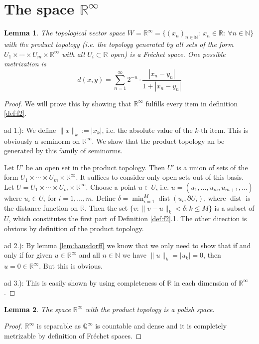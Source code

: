 \documentclass{scrartcl}
\newtheorem{lemma}{Lemma}
\theoremstyle{definition}
\theoremstyle{remark}
\newcommand{\Frechet}{Fr\'echet }
\newcommand{\N}{\mathbb N}
\newcommand{\R}{\mathbb R}
\newcommand{\Q}{\mathbb Q}
\newcommand{\del}{\partial}
\newcommand{\dist}{\operatorname{dist}}
\begin{document}
\section{The space $\R^\infty$}
\begin{lemma}
The topological vector space $W = \R^\infty = \{(x_n)_{n\in\N}: ~x_n\in\R:~\forall n\in\N \}$ with the product topology (i.e. the topology generated by all sets of the form $U_1\times\cdots\times U_m\times \R^\infty$ with all $U_i\subset \R $ open) is a \Frechet space. One possible metrization is
\begin{equation}
d(x, y) = \sum_{n=1}^{\infty}2^{-n}\cdot \frac{|x_n-y_n|}{1 + |x_n-y_n|}
\end{equation}
\end{lemma}
\begin{proof}
We will prove this by showing that $\R^\infty$ fulfills every item in definition \ref{def:f2}.

ad 1.): We define $\|x\|_k := |x_k|$, i.e. the absolute value of the $k$-th item. This is obviously a seminorm on $\R^\infty$. We show that the product topology an be generated by this family of seminorms. 

Let $U'$ be an open set in the product topology. Then $U'$ is a union of sets of the form $U_1\times\cdots\times U_m\times \R^\infty$. It suffices to consider only open sets out of this basis. Let $U = U_1\times\cdots\times U_m\times \R^\infty$. Choose a point $u\in U$, i.e. $u = (u_1, \ldots, u_m, u_{m+1},\ldots)$ where $u_i \in U_i$ for $i=1,\ldots, m$. Define $\delta = \min_{i=1}^M \dist(u_i, \del U_i)$, where $\dist$ is the distance function on $\R$. Then the set $\{v: \|v-u\|_k < \delta: k\leq M\} $ is a subset of $U$, which constitutes the first part of Definition \ref{def:f2}.1. The other direction is obvious by definition of the product topology.

ad 2.): By lemma \ref{lem:hausdorff} we know that we only need to show that if and only if for given $u\in\R^\infty$ and all $n\in \N$ we have $\|u\|_k = |u_k| = 0$, then $u=0\in\R^\infty$. But this is obvious.

ad 3.): This is easily shown by using completeness of $\R$ in each dimension of $\R^\infty$.
\end{proof}

\begin{lemma}
The space $\R^\infty$ with the product topology is a polish space.
\end{lemma}
\begin{proof}
$\R^\infty$ is separable as $\Q^\infty$ is countable and dense and it is completely metrizable by definition of \Frechet spaces.
\end{proof}
\end{document}
